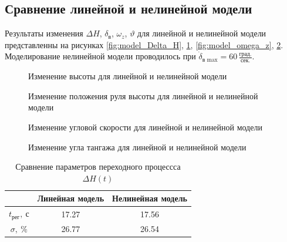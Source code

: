 \subsection{Сравнение линейной и нелинейной модели}

Результаты изменения $\Delta H$, $\delta_{в}$, $\omega_z$, $\vartheta$ для
линейной и нелинейной модели представленны на рисунках \ref{fig:model_Delta_H},
\ref{fig:delta_elevator}, \ref{fig:model_omega_z}, \ref{fig:model_theta}.
Моделирование нелинейной модели проводилось при 
$\dot{\delta}_\text{в max} = 60\, \frac{\text{град.}}{\text{сек.}}$.

\begin{figure}[H]
    \begin{minipage}{0.48\textwidth}
    \centering
    \resizebox{1.1\linewidth}{!}{}
    \caption{Изменение высоты для линейной и нелинейной модели}
    \label{fig:model_Delta_H}
    \end{minipage}
    \hfill
    \begin{minipage}{0.48\textwidth}
    \centering
    \resizebox{1.1\linewidth}{!}{}
    \caption{Изменение положения руля высоты для линейной и нелинейной модели}
    \label{fig:delta_elevator}
    \end{minipage}
\end{figure}

\begin{figure}[H]
    \begin{minipage}{0.48\textwidth}
    \centering
    \resizebox{1.1\linewidth}{!}{}
    \caption{Изменение угловой скорости для линейной и нелинейной модели}
    \label{fig:model_omega_z}
    \end{minipage}
    \hfill
    \begin{minipage}{0.48\textwidth}
    \centering
    \resizebox{1.1\linewidth}{!}{}
    \caption{Изменение угла тангажа для линейной и нелинейной модели}
    \label{fig:model_theta}
\end{minipage}
\end{figure}

\begin{table}[htpb]
    \centering
    \caption{Сравнение параметров переходного процессса $\Delta H(t)$}
    \label{tab:stat_lin_nonlin}
    \begin{tabular}{|c|c|c|}
    \hline
    {} &  Линейная модель &  Нелинейная модель \\
    \hline
    $t_{рег},\ с$ &            17.27 &              17.56 \\
    $\sigma,\ \%$ &            26.77 &              26.54 \\
    \hline
    \end{tabular}
\end{table}
